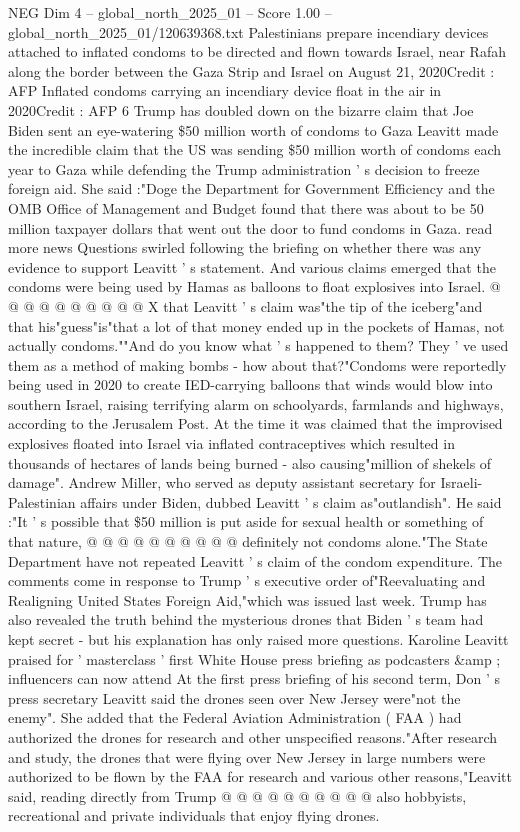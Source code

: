 \begin{textsample}{NEG Dim 4 – global\_north\_2025\_01 – Score 1.00 – global\_north\_2025\_01/120639368.txt}  \label{ex:f4_neg_418}
Palestinians prepare incendiary devices attached to inflated condoms to be directed and flown towards Israel, near Rafah along the border between the Gaza Strip and Israel on August 21, 2020Credit : AFP Inflated condoms carrying an incendiary device float in the air in 2020Credit : AFP 6 Trump has doubled down on the bizarre claim that Joe Biden sent an eye-watering \$50 million worth of condoms to Gaza Leavitt made the incredible claim that the US was sending \$50 million worth of condoms each year to Gaza while defending the Trump administration ' s decision to freeze foreign aid.
She said :"Doge the Department for Government Efficiency and the OMB Office of Management and Budget found that there was about to be 50 million taxpayer dollars that went out the door to fund condoms in Gaza. read more news Questions swirled following the briefing on whether there was any evidence to support Leavitt ' s statement.
And various claims emerged that the condoms were being used by Hamas as balloons to float explosives into Israel. @ @ @ @ @ @ @ @ @ @ X that Leavitt ' s claim was"the tip of the iceberg"and that his"guess"is"that a lot of that money ended up in the pockets of Hamas, not actually condoms.""And do you know what ' s happened to them?
They ' ve used them as a method of making bombs - how about that?"Condoms were reportedly being used in 2020 to create IED-carrying balloons that winds would blow into southern Israel, raising terrifying alarm on schoolyards, farmlands and highways, according to the Jerusalem Post.
At the time it was claimed that the improvised explosives floated into Israel via inflated contraceptives which resulted in thousands of hectares of lands being burned - also causing"million of shekels of damage".
Andrew Miller, who served as deputy assistant secretary for Israeli-Palestinian affairs under Biden, dubbed Leavitt ' s claim as"outlandish".
He said :"It ' s possible that \$50 million is put aside for sexual health or something of that nature, @ @ @ @ @ @ @ @ @ @ definitely not condoms alone."The State Department have not repeated Leavitt ' s claim of the condom expenditure.
The comments come in response to Trump ' s executive order of"Reevaluating and Realigning United States Foreign Aid,"which was issued last week.
Trump has also revealed the truth behind the mysterious drones that Biden ' s team had kept secret - but his explanation has only raised more questions.
Karoline Leavitt praised for ' masterclass ' first White House press briefing as podcasters \&amp ; influencers can now attend At the first press briefing of his second term, Don ' s press secretary Leavitt said the drones seen over New Jersey were"not the enemy".
She added that the Federal Aviation Administration ( FAA ) had authorized the drones for research and other unspecified reasons."After research and study, the drones that were flying over New Jersey in large numbers were authorized to be flown by the FAA for research and various other reasons,"Leavitt said, reading directly from Trump @ @ @ @ @ @ @ @ @ @ also hobbyists, recreational and private individuals that enjoy flying drones.

\end{textsample}
